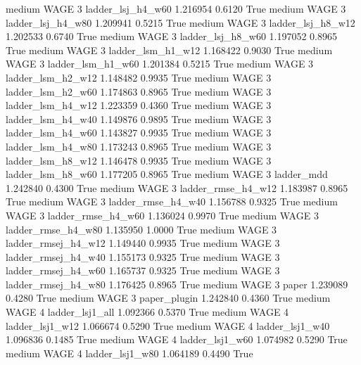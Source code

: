     medium     WAGE                 3   ladder_lsj_h4_w60   1.216954      0.6120    True
    medium     WAGE                 3   ladder_lsj_h4_w80   1.209941      0.5215    True
    medium     WAGE                 3   ladder_lsj_h8_w12   1.202533      0.6740    True
    medium     WAGE                 3   ladder_lsj_h8_w60   1.197052      0.8965    True
    medium     WAGE                 3   ladder_lsm_h1_w12   1.168422      0.9030    True
    medium     WAGE                 3   ladder_lsm_h1_w60   1.201384      0.5215    True
    medium     WAGE                 3   ladder_lsm_h2_w12   1.148482      0.9935    True
    medium     WAGE                 3   ladder_lsm_h2_w60   1.174863      0.8965    True
    medium     WAGE                 3   ladder_lsm_h4_w12   1.223359      0.4360    True
    medium     WAGE                 3   ladder_lsm_h4_w40   1.149876      0.9895    True
    medium     WAGE                 3   ladder_lsm_h4_w60   1.143827      0.9935    True
    medium     WAGE                 3   ladder_lsm_h4_w80   1.173243      0.8965    True
    medium     WAGE                 3   ladder_lsm_h8_w12   1.146478      0.9935    True
    medium     WAGE                 3   ladder_lsm_h8_w60   1.177205      0.8965    True
    medium     WAGE                 3          ladder_mdd   1.242840      0.4300    True
    medium     WAGE                 3  ladder_rmse_h4_w12   1.183987      0.8965    True
    medium     WAGE                 3  ladder_rmse_h4_w40   1.156788      0.9325    True
    medium     WAGE                 3  ladder_rmse_h4_w60   1.136024      0.9970    True
    medium     WAGE                 3  ladder_rmse_h4_w80   1.135950      1.0000    True
    medium     WAGE                 3 ladder_rmsej_h4_w12   1.149440      0.9935    True
    medium     WAGE                 3 ladder_rmsej_h4_w40   1.155173      0.9325    True
    medium     WAGE                 3 ladder_rmsej_h4_w60   1.165737      0.9325    True
    medium     WAGE                 3 ladder_rmsej_h4_w80   1.176425      0.8965    True
    medium     WAGE                 3               paper   1.239089      0.4280    True
    medium     WAGE                 3        paper_plugin   1.242840      0.4360    True
    medium     WAGE                 4     ladder_lsj1_all   1.092366      0.5370    True
    medium     WAGE                 4     ladder_lsj1_w12   1.066674      0.5290    True
    medium     WAGE                 4     ladder_lsj1_w40   1.096836      0.1485    True
    medium     WAGE                 4     ladder_lsj1_w60   1.074982      0.5290    True
    medium     WAGE                 4     ladder_lsj1_w80   1.064189      0.4490    True
